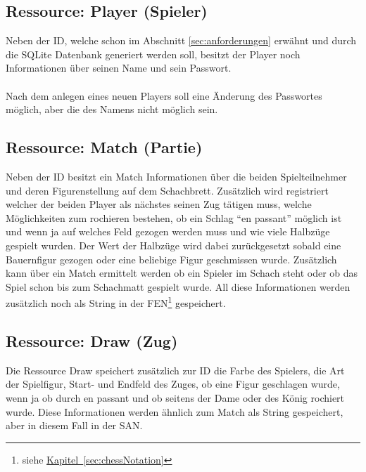 \subsection{Ressource: Player (Spieler)}\label{sec:resplayer}
Neben der ID, welche schon im Abschnitt \ref{sec:anforderungen} erwähnt und durch die SQLite Datenbank generiert werden soll, besitzt der Player noch Informationen über seinen Name und sein Passwort.\\
\\
Nach dem anlegen eines neuen Players soll eine Änderung des Passwortes möglich, aber die des Namens nicht möglich sein.

\subsection{Ressource: Match (Partie)}\label{sec:resmatch}
Neben der ID besitzt ein Match Informationen über die beiden Spielteilnehmer und deren Figurenstellung auf dem Schachbrett. Zusätzlich wird registriert welcher der beiden Player als nächstes seinen Zug tätigen muss, welche Möglichkeiten zum rochieren bestehen, ob ein Schlag \enquote{en passant} möglich ist und wenn ja auf welches Feld gezogen werden muss und wie viele Halbzüge gespielt wurden. Der Wert der Halbzüge wird dabei zurückgesetzt sobald eine Bauernfigur gezogen oder eine beliebige Figur geschmissen wurde. Zusätzlich kann über ein Match ermittelt werden ob ein Spieler im Schach steht oder ob das Spiel schon bis zum Schachmatt gespielt wurde. All diese Informationen werden zusätzlich noch als String in der \gls{FEN}\footnote{\label{foot:chapter}siehe \hyperref[sec:chessNotation]{Kapitel~\ref{sec:chessNotation}}} gespeichert.

\subsection{Ressource: Draw (Zug)}\label{sec:resdraw}
Die Ressource Draw speichert zusätzlich zur ID die Farbe des Spielers, die Art der Spielfigur, Start- und Endfeld des Zuges, ob eine Figur geschlagen wurde, wenn ja ob durch en passant und ob seitens der Dame oder des König rochiert wurde. Diese Informationen werden ähnlich zum Match als String gespeichert, aber in diesem Fall in der \gls{SAN}.

